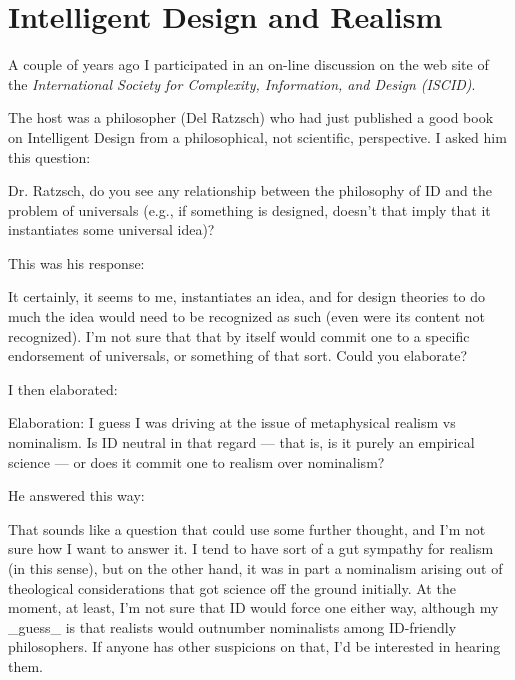 \section{Intelligent Design and Realism}

\label{sec:IntelligentDesignandRealism}

A couple of years ago I participated in an on-line discussion on the web site of the \textit{International Society for Complexity, Information, and Design (ISCID)}.

The host was a philosopher (Del Ratzsch) who had just published a good book on Intelligent Design from a philosophical, not scientific, perspective. I asked him this question:

\begin{quotex}
Dr. Ratzsch, do you see any relationship between the philosophy of ID and the problem of universals (e.g., if something is designed, doesn't that imply that it instantiates some universal idea)?
\end{quotex}

This was his response:

\begin{quotex}
It certainly, it seems to me, instantiates an idea, and for design theories to do much the idea would need to be recognized as such (even were its content not recognized). I'm not sure that that by itself would commit one to a specific endorsement of universals, or something of that sort. Could you elaborate? 
\end{quotex}

I then elaborated:

\begin{quotex}
Elaboration: I guess I was driving at the issue of metaphysical realism vs nominalism. Is ID neutral in that regard — that is, is it purely an empirical science — or does it commit one to realism over nominalism?
\end{quotex}

He answered this way:

\begin{quotex}
That sounds like a question that could use some further thought, and I'm not sure how I want to answer it. I tend to have sort of a gut sympathy for realism (in this sense), but on the other hand, it was in part a nominalism arising out of theological considerations that got science off the ground initially. At the moment, at least, I'm not sure that ID would force one either way, although my \_guess\_ is that realists would outnumber nominalists among ID-friendly philosophers. If anyone has other suspicions on that, I'd be interested in hearing them.
\end{quotex}

